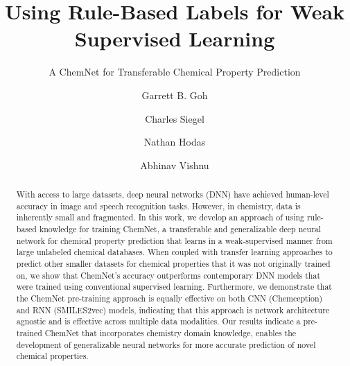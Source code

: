 \documentclass[sigconf]{acmart}
\begin{document}
\title{Using Rule-Based Labels for Weak Supervised Learning}
\subtitle{A ChemNet for Transferable Chemical Property Prediction}

\author{Garrett B. Goh}

\author{Charles Siegel}

\author{Nathan Hodas}

\author{Abhinav Vishnu}

\renewcommand{\shortauthors}{Goh G.B. et al.}

\begin{abstract}
With access to large datasets, deep neural networks (DNN) have achieved human-level accuracy in image and speech recognition tasks. However, in chemistry, data is inherently small and fragmented. In this work, we develop an approach of using rule-based knowledge for training ChemNet, a transferable and generalizable deep neural network for chemical property prediction that learns in a weak-supervised manner from large unlabeled chemical databases. When coupled with transfer learning approaches to predict other smaller datasets for chemical properties that it was not originally trained on, we show that ChemNet's accuracy outperforms contemporary DNN models that were trained using conventional supervised learning. Furthermore, we demonstrate that the ChemNet pre-training approach is equally effective on both CNN (Chemception) and RNN (SMILES2vec) models, indicating that this approach is network architecture agnostic and is effective across multiple data modalities. Our results indicate a pre-trained ChemNet that incorporates chemistry domain knowledge, enables the development of generalizable neural networks for more accurate prediction of novel chemical properties.
\end{abstract}
\end{document}
